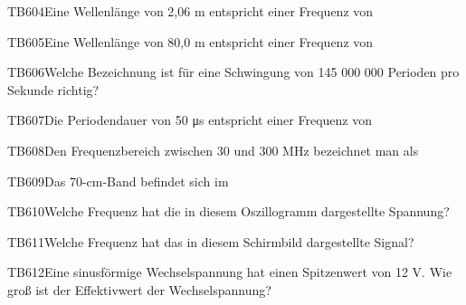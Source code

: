 \begin{question}{TB604}{Eine Wellenlänge von 2,06 m entspricht einer Frequenz von}
\end{question}

\begin{question}{TB605}{Eine Wellenlänge von 80,0 m entspricht einer Frequenz von}
\end{question}

\begin{question}{TB606}{Welche Bezeichnung ist für eine Schwingung von 145 000 000 Perioden pro Sekunde richtig?}
\end{question}

\begin{question}{TB607}{Die Periodendauer von 50 μs entspricht einer Frequenz von}
\end{question}

\begin{question}{TB608}{Den Frequenzbereich zwischen 30 und 300 MHz bezeichnet man als}
\end{question}

\begin{question}{TB609}{Das 70-cm-Band befindet sich im}
\end{question}

\begin{question}{TB610}{Welche Frequenz hat die in diesem Oszillogramm dargestellte Spannung?}
\end{question}

\begin{question}{TB611}{Welche Frequenz hat das in diesem Schirmbild dargestellte Signal?}
\end{question}

\begin{question}{TB612}{Eine sinusförmige Wechselspannung hat einen Spitzenwert von 12 V. Wie groß ist der Effektivwert der Wechselspannung?}
\end{question}

